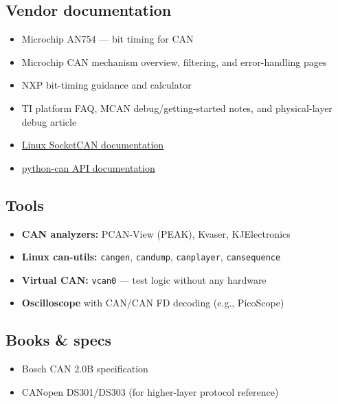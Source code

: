\documentclass[12pt,a4paper,oneside]{report}
\providecommand{\tightlist}{\setlength{\itemsep}{0pt}\setlength{\parskip}{0pt}}
\begin{document}
\subsection{Vendor documentation}\label{vendor-documentation}

\begin{itemize}
\tightlist
\item
  Microchip AN754 --- bit timing for CAN
\item
  Microchip CAN mechanism overview, filtering, and error-handling pages
\item
  NXP bit-timing guidance and calculator
\item
  TI platform FAQ, MCAN debug/getting-started notes, and physical-layer debug
  article
\item
  \href{https://www.kernel.org/doc/html/latest/networking/can.html}{Linux
  SocketCAN documentation}
\item
  \href{https://python-can.readthedocs.io/}{python-can API documentation}
\end{itemize}

\subsection{Tools}\label{tools}

\begin{itemize}
\tightlist
\item
  \textbf{CAN analyzers:} PCAN-View (PEAK), Kvaser, KJElectronics
\item
  \textbf{Linux can-utils:} \texttt{cangen}, \texttt{candump},
  \texttt{canplayer}, \texttt{cansequence}
\item
  \textbf{Virtual CAN:} \texttt{vcan0} --- test logic without any hardware
\item
  \textbf{Oscilloscope} with CAN/CAN FD decoding (e.g., PicoScope)
\end{itemize}

\subsection{Books \& specs}\label{books-specs}

\begin{itemize}
\tightlist
\item
  Bosch CAN 2.0B specification
\item
  CANopen DS301/DS303 (for higher-layer protocol reference)
\end{itemize}
\end{document}

